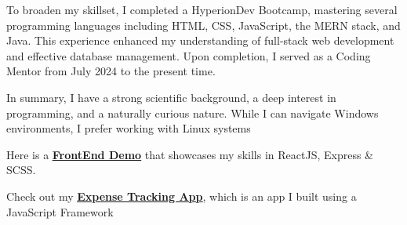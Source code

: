 \documentclass[a4paper,10pt]{article}
\begin{document}
To broaden my skillset, I completed a HyperionDev Bootcamp, mastering several programming languages including HTML, CSS, JavaScript, the MERN stack, and Java. This experience enhanced my understanding of full-stack web development and effective database management. Upon completion, I served as a Coding Mentor from July 2024 to the present time.

In summary, I have a strong scientific background, a deep interest in programming, and a naturally curious nature. While I can navigate Windows environments, I prefer working with Linux systems {\faLinux}{\vspace*{2pt}}

\begin{center}	
	{\fontsize{11}{10}\selectfont\textcolor{burnt}{\faHandPointRight} Here is a \href{https://coalition-fed.onrender.com/}{\textbf{\underline{FrontEnd Demo}}} that showcases my skills in ReactJS, Express \& SCSS. \textcolor{burnt}{\faHandPointLeft}}
\end{center}

\begin{center}	
{\fontsize{11}{10}\selectfont\textcolor{burnt}{\faHandPointRight} Check out my \href{https://expense-tracker-five-sepia.vercel.app/}{\textbf{\underline{Expense Tracking App}}}, which is an app I built using a JavaScript Framework \textcolor{burnt}{\faHandPointLeft}}
\end{center}
\end{document}
